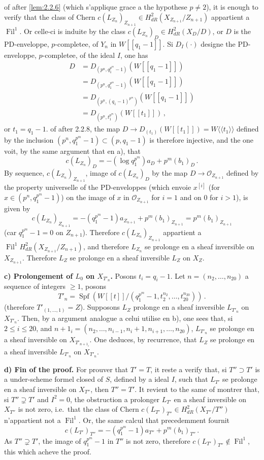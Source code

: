 \documentclass[12pt,a4paper]{article}
\theoremstyle{plain}
\theoremstyle{definition}
\theoremstyle{remark}
\DeclareMathOperator{\Spf}{Spf}
\DeclareMathOperator{\Fil}{Fil}
\begin{document}
of after \ref{lem:2.2.6} (which s'applique grace a the hypothese $p \neq 2$), it is enough to verify that the class of Chern $c(L_{Z_n})_{Z_{n+1}} \in H_{dR}^2(X_{Z_{n+1}}/Z_{n+1})$ appartient a $\Fil^1$. Or celle-ci is induite by the class $c(L_{Z_n})_D \in H_{dR}^2(X_D/D)$, or $D$ is the PD-enveloppe, $p$-completee, of $Y_n$ in $W[[q_1-1]]$. Si $D_I(\cdot)$ designe the PD-enveloppe, $p$-completee, of the ideal $I$, one has
\[
\begin{aligned}
D &= D_{(p^n, q_1^{p^m}-1)}(W[[q_1-1]]) \\
&= D_{(p^n, q_1^{p^m}-1)}(W[[q_1-1]]) \\
&= D_{(p^n, (q_1-1)^{p^m})}(W[[q_1-1]]) \\
&= D_{(p^n, t_1^{p^m})}(W[[t_1]])\,,
\end{aligned}
\]
or $t_1 = q_1 - 1$. of after 2.2.8, the map $D \to D_{(t_1)}(W[[t_1]]) = W\langle\langle t_1 \rangle\rangle$ defined by the inclusion $(p^n, q_1^{p^m} - 1) \subset (p, q_1 - 1)$ is therefore injective, and the one voit, by the same argument that en a), that
\[
c(L_{Z_n})_D = -(\log q_1^{p^m})a_D + p^m(b_1)_D\,.\]
By sequence, $c(L_{Z_n})_{Z_{n+1}}$, image of $c(L_{Z_n})_D$ by the map $D \to \mathcal{O}_{Z_{n+1}}$ defined by the property universelle of the PD-enveloppes (which envoie $x^{[i]}$ (for $x \in (p^n, q_1^{p^m} - 1)$) on the image of $x$ in $\mathcal{O}_{Z_{n+1}}$ for $i = 1$ and on $0$ for $i > 1$), is given by
\[
c(L_{Z_n})_{Z_{n+1}} = -(q_1^{p^m} - 1)a_{Z_{n+1}} + p^m(b_1)_{Z_{n+1}} = p^m(b_1)_{Z_{n+1}}
\]
(car $q_1^{p^m} - 1 = 0$ on $Z_{n+1}$). Therefore $c(L_{Z_n})_{Z_{n+1}}$ appartient a $\Fil^1H_{dR}^2(X_{Z_{n+1}}/Z_{n+1})$, and therefore $L_{Z_n}$ se prolonge en a sheaf inversible on $X_{Z_{n+1}}$. Therefore $L_Z$ se prolonge en a sheaf inversible $L_Z$ on $X_Z$.

\textbf{c) Prolongement of $L_0$ on $X_{T'_n}$.} Posons $t_i = q_i - 1$. Let $n = (n_2, \ldots, n_{20})$ a sequence of integers $\geq 1$, posons
\[
T'_n = \Spf(W[[t]]/(q_1^{p^m} - 1, t_2^{n_2}, \ldots, t_{20}^{n_{20}}))\,.
\]
(therefore $T'_{(1, \ldots, 1)} = Z$). Supposons $L_Z$ prolonge en a sheaf inversible $L_{T'_n}$ on $X_{T'_n}$. Then, by a argument analogue a celui utilise en b), one sees that, si $2 \leq i \leq 20$, and $n+1_i = (n_2, \ldots, n_{i-1}, n_i+1, n_{i+1}, \ldots, n_{20})$, $L_{T'_n}$ se prolonge en a sheaf inversible on $X_{T'_{n+1_i}}$. One deduces, by recurrence, that $L_Z$ se prolonge en a sheaf inversible $L_{T'_n}$ on $X_{T'_n}$.

\textbf{d) Fin of the proof.} For prouver that $T' = T$, it reste a verify that, si $T'' \supset T'$ is a under-scheme formel closed of $S$, defined by a ideal $I$, such that $L_{T'}$ se prolonge en a sheaf inversible on $X_{T''}$, then $T'' = T'$. It revient to the same of montrer that, si $T'' \supsetneq T'$ and $I^2 = 0$, the obstruction a prolonger $L_{T'}$ en a sheaf inversible on $X_{T''}$ is not zero, i.e.\ that the class of Chern $c(L_{T'})_{T''} \in H_{dR}^2(X_{T''}/T'')$ n'appartient not a $\Fil^1$. Or, the same calcul that precedemment fournit
\[
c(L_{T'})_{T''} = -(q_1^{p^m} - 1)a_{T''} + p^m(b_1)_{T''}\,.\]
As $T'' \supsetneq T'$, the image of $q_1^{p^m} - 1$ in $T''$ is not zero, therefore $c(L_{T'})_{T''} \notin \Fil^1$, this which acheve the proof.
\end{document}
